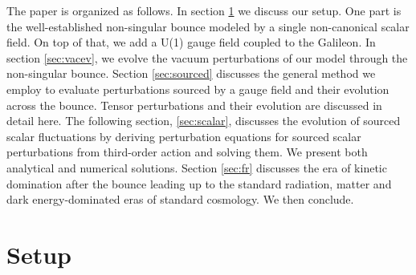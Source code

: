 \documentclass[12pt,a4paper]{article}
\numberwithin{equation}{section}
\numberwithin{equation}{section}
\begin{document}

The paper is organized as follows. In section \ref{sec:nonsinb} 
 we discuss our setup. One part is the well-established non-singular bounce
modeled by a single non-canonical scalar field. On top of that, we add a U(1) gauge field coupled to the Galileon. In section \ref{sec:vacev}, we evolve the vacuum perturbations of our model through the non-singular bounce. 
Section \ref{sec:sourced} discusses the general method we employ to evaluate perturbations sourced by a gauge field and their evolution across the bounce. Tensor perturbations and their evolution are discussed in detail here. The following section, \ref{sec:scalar}, discusses the evolution of sourced scalar fluctuations by deriving perturbation equations for sourced scalar perturbations from third-order action and solving them. We present both analytical and numerical solutions. Section \ref{sec:fr} discusses the era of kinetic domination after the bounce leading up to the standard radiation, matter and dark energy-dominated eras of standard cosmology. We then conclude.

\section{Setup}
\label{sec:nonsinb}
\end{document}
